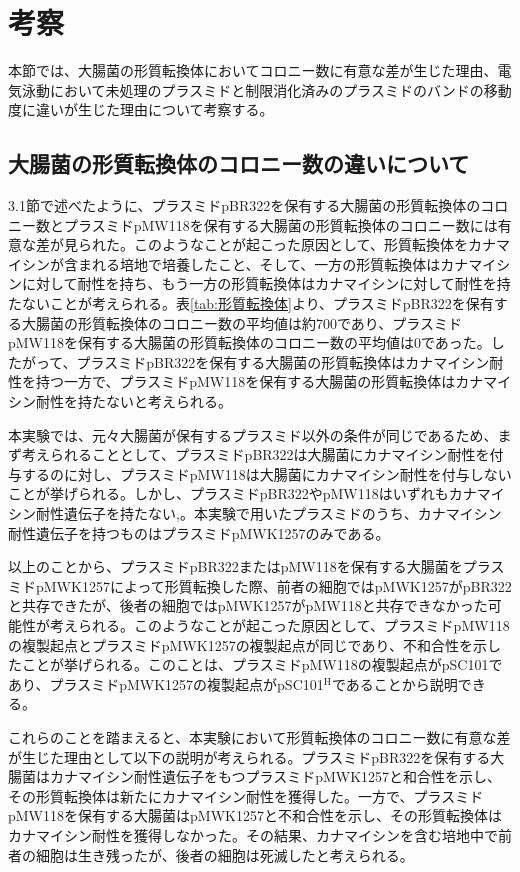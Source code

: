 \documentclass[paper=a4, head_space=20mm, foot_space=25mm]{jlreq}
\begin{document}
    \section{考察}
        本節では、大腸菌の形質転換体においてコロニー数に有意な差が生じた理由、電気泳動において未処理のプラスミドと制限消化済みのプラスミドのバンドの移動度に違いが生じた理由について考察する。
        
        \subsection{大腸菌の形質転換体のコロニー数の違いについて}
            3.1節で述べたように、プラスミドpBR322を保有する大腸菌の形質転換体のコロニー数とプラスミドpMW118を保有する大腸菌の形質転換体のコロニー数には有意な差が見られた。このようなことが起こった原因として、形質転換体をカナマイシンが含まれる培地で培養したこと、そして、一方の形質転換体はカナマイシンに対して耐性を持ち、もう一方の形質転換体はカナマイシンに対して耐性を持たないことが考えられる。表\ref{tab:形質転換体}より、プラスミドpBR322を保有する大腸菌の形質転換体のコロニー数の平均値は約700であり、プラスミドpMW118を保有する大腸菌の形質転換体のコロニー数の平均値は0であった。したがって、プラスミドpBR322を保有する大腸菌の形質転換体はカナマイシン耐性を持つ一方で、プラスミドpMW118を保有する大腸菌の形質転換体はカナマイシン耐性を持たないと考えられる。

            本実験では、元々大腸菌が保有するプラスミド以外の条件が同じであるため、まず考えられることとして、プラスミドpBR322は大腸菌にカナマイシン耐性を付与するのに対し、プラスミドpMW118は大腸菌にカナマイシン耐性を付与しないことが挙げられる。しかし、プラスミドpBR322やpMW118はいずれもカナマイシン耐性遺伝子を持たない\cite{pBR322},\cite{pMW118}。本実験で用いたプラスミドのうち、カナマイシン耐性遺伝子を持つものはプラスミドpMWK1257のみである\cite{pHN1257}。
            
            以上のことから、プラスミドpBR322またはpMW118を保有する大腸菌をプラスミドpMWK1257によって形質転換した際、前者の細胞ではpMWK1257がpBR322と共存できたが、後者の細胞ではpMWK1257がpMW118と共存できなかった可能性が考えられる。このようなことが起こった原因として、プラスミドpMW118の複製起点とプラスミドpMWK1257の複製起点が同じであり、不和合性を示したことが挙げられる。このことは、プラスミドpMW118の複製起点がpSC101であり\cite{pMW118}、プラスミドpMWK1257の複製起点がpSC101$^\mathrm{H}$であること\cite{pHN1257}から説明できる。

            これらのことを踏まえると、本実験において形質転換体のコロニー数に有意な差が生じた理由として以下の説明が考えられる。プラスミドpBR322を保有する大腸菌はカナマイシン耐性遺伝子をもつプラスミドpMWK1257と和合性を示し、その形質転換体は新たにカナマイシン耐性を獲得した。一方で、プラスミドpMW118を保有する大腸菌はpMWK1257と不和合性を示し、その形質転換体はカナマイシン耐性を獲得しなかった。その結果、カナマイシンを含む培地中で前者の細胞は生き残ったが、後者の細胞は死滅したと考えられる。
\end{document}
